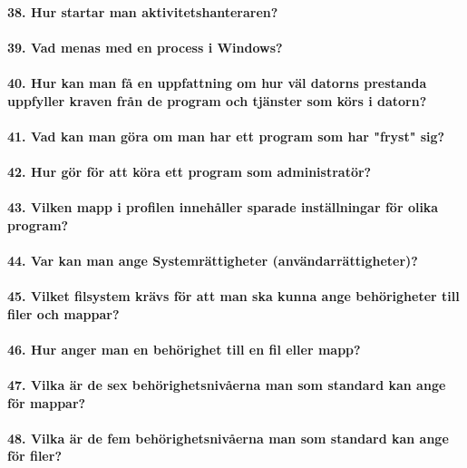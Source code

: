 \paragraph{38. Hur startar man aktivitetshanteraren?}

\paragraph{39. Vad menas med en process i Windows?}

\paragraph{40. Hur kan man få en uppfattning om hur väl datorns prestanda uppfyller kraven från de program och tjänster som körs i datorn?}

\paragraph{41. Vad kan man göra om man har ett program som har "fryst" sig?}

\paragraph{42. Hur gör för att köra ett program som administratör?}

\paragraph{43. Vilken mapp i profilen innehåller sparade inställningar för olika program?}

\paragraph{44. Var kan man ange Systemrättigheter (användarrättigheter)?}

\paragraph{45. Vilket filsystem krävs för att man ska kunna ange behörigheter till filer och mappar?}

\paragraph{46. Hur anger man en behörighet till en fil eller mapp?} 

\paragraph{47. Vilka är de sex behörighetsnivåerna man som standard kan ange för mappar?}

\paragraph{48. Vilka är de fem behörighetsnivåerna man som standard kan ange för filer?}














